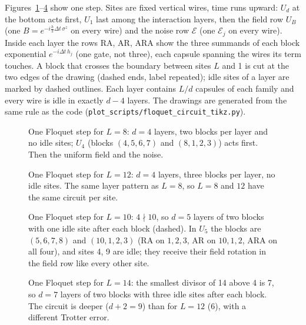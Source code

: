 Figures~\ref{fig:floquet-circuit-8}--\ref{fig:floquet-circuit-14} show one step. Sites are fixed vertical wires, time runs upward: $U_d$ at the bottom acts first, $U_1$ last among the interaction layers, then the field row $U_B$ (one $B = e^{-i\frac h2\Delta t\,\sigma^z}$ on every wire) and the noise row $\mathcal E$ (one $\mathcal E_j$ on every wire). Inside each layer the rows RA, AR, ARA show the three summands of each block exponential $e^{-i\Delta t\, h_j}$ (one gate, not three), each capsule spanning the wires its term touches. A block that crosses the boundary between sites $L$ and 1 is cut at the two edges of the drawing (dashed ends, label repeated); idle sites of a layer are marked by dashed outlines. Each layer contains $L/d$ capsules of each family and every wire is idle in exactly $d - 4$ layers. The drawings are generated from the same rule as the code (\texttt{plot\_scripts/floquet\_circuit\_tikz.py}).

\begin{figure}[H]
\centering
\resizebox{0.62\textwidth}{!}{}
\caption{One Floquet step for $L = 8$: $d = 4$ layers, two blocks per layer and no idle sites; $U_4$ (blocks $(4,5,6,7)$ and $(8,1,2,3)$) acts first. Then the uniform field and the noise.}
\label{fig:floquet-circuit-8}
\end{figure}

\begin{figure}[H]
\centering
\resizebox{0.95\textwidth}{!}{}
\caption{One Floquet step for $L = 12$: $d = 4$ layers, three blocks per layer, no idle sites. The same layer pattern as $L = 8$, so $L = 8$ and $12$ have the same circuit per site.}
\label{fig:floquet-circuit-12}
\end{figure}

\begin{figure}[H]
\centering
\resizebox{0.85\textwidth}{!}{}
\caption{One Floquet step for $L = 10$: $4 \nmid 10$, so $d = 5$ layers of two blocks with one idle site after each block (dashed). In $U_5$ the blocks are $(5,6,7,8)$ and $(10,1,2,3)$ (RA on $1,2,3$, AR on $10,1,2$, ARA on all four), and sites 4, 9 are idle; they receive their field rotation in the field row like every other site.}
\label{fig:floquet-circuit-10}
\end{figure}

\begin{figure}[H]
\centering
\resizebox{0.95\textwidth}{!}{}
\caption{One Floquet step for $L = 14$: the smallest divisor of 14 above 4 is 7, so $d = 7$ layers of two blocks with three idle sites after each block. The circuit is deeper ($d + 2 = 9$) than for $L = 12$ (6), with a different Trotter error.}
\label{fig:floquet-circuit-14}
\end{figure}

